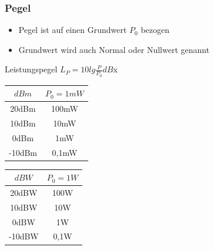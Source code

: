 \begin{frame}
  \frametitle{Pegel}

    \begin{itemize}
      \item Pegel ist auf einen Grundwert $P_0$ bezogen
      \item Grundwert wird auch Normal oder Nullwert genannt
    \end{itemize}

    \begin{block}{Leistungspegel}
      \centering \Large $L_P = 10 lg \frac{P}{P_0} dB$\alert{x}
    \end{block}

  \begin{center}
    \begin{minipage}{0.3\textwidth}
      \begin{tabular}{|c|c|}
        \hline
        $dBm$ & $P_0 = 1 mW$ \\
        \hline \hline
        20dBm  & 100mW  \\ \hline
        10dBm  & 10mW   \\ \hline
        0dBm   & 1mW    \\ \hline
        -10dBm & 0,1mW  \\ \hline
      \end{tabular}
    \end{minipage}
    \hspace{2cm}
    \begin{minipage}{0.3\textwidth}
      \begin{tabular}{|c|c|}
        \hline
        $dBW$ & $P_0 = 1 W$ \\
        \hline \hline
        20dBW  & 100W  \\ \hline
        10dBW  & 10W   \\ \hline
        0dBW   & 1W    \\ \hline
        -10dBW & 0,1W  \\ \hline
      \end{tabular}
    \end{minipage}
    \vspace{0.5cm}
  \end{center}
\end{frame}



